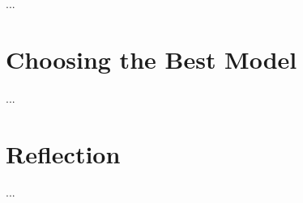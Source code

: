 \documentclass[a4paper]{article}
\begin{document}
...


\section{Choosing the Best Model}
...




\section{Reflection}
...





\end{document}
